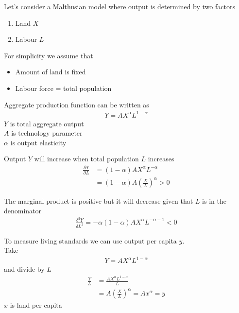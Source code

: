 \documentclass{beamer}
\begin{document}
\begin{frame}
 Let's consider a Malthusian model where output is determined by two factors 
 \begin{enumerate}
   \item Land $X$
   \item Labour $L$
 \end{enumerate}
 \medskip
 For simplicity we assume that
 \begin{itemize}
   \item Amount of land is fixed
   \item Labour force = total population
 \end{itemize} 
\end{frame}

\begin{frame}
  Aggregate production function can be written as  
  \begin{align}
    Y=AX^{\alpha}L^{1-\alpha}
  \end{align}
  \medskip
  $Y$ is total aggregate output\\
  $A$ is technology parameter\\
  $\alpha$ is output elasticity
\end{frame}

\begin{frame}
  Output $Y$ will increase when total population $L$ increases
  \begin{align}
    \frac{\partial Y}{\partial L} &= (1-\alpha)AX^{\alpha}L^{-\alpha}\\
  &= (1-\alpha)A \left( \frac{X}{L} \right)^{\alpha} > 0
  \end{align}  
\end{frame}

\begin{frame}
  The marginal product is positive but it will decrease given that $L$ is in the denominator  
  \begin{align}
    \frac{\delta^2Y}{\delta L^2} = -\alpha(1-\alpha)AX^{\alpha}L^{-\alpha-1}<0
  \end{align}
\end{frame}

\begin{frame}
  To measure living standards we can use output per capita $y$.\\  
  Take 
  \begin{align}
    Y=AX^{\alpha}L^{1-\alpha}
  \end{align}
  and divide by $L$
  \begin{align}
    \frac{Y}{L} &= \frac{AX^{\alpha}L^{1-\alpha}}{L}\\
    &= A\left ( \frac{X}{L} \right)^{\alpha} = Ax^{\alpha} = y
  \end{align}
  $x$ is land per capita
\end{frame}
\end{document}
